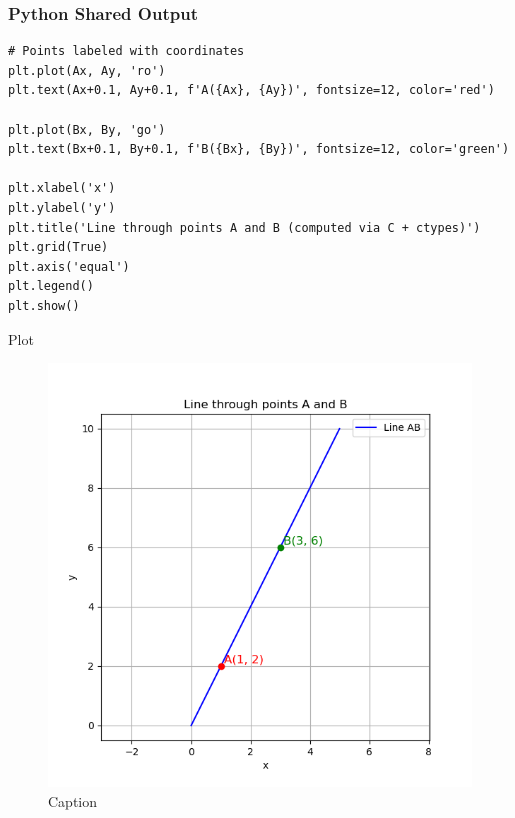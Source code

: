 \documentclass{beamer}
\begin{document}
\begin{frame}[fragile]
    \frametitle{Python Shared Output}
    \begin{lstlisting}
# Points labeled with coordinates
plt.plot(Ax, Ay, 'ro')
plt.text(Ax+0.1, Ay+0.1, f'A({Ax}, {Ay})', fontsize=12, color='red')

plt.plot(Bx, By, 'go')
plt.text(Bx+0.1, By+0.1, f'B({Bx}, {By})', fontsize=12, color='green')

plt.xlabel('x')
plt.ylabel('y')
plt.title('Line through points A and B (computed via C + ctypes)')
plt.grid(True)
plt.axis('equal')
plt.legend()
plt.show()
 \end{lstlisting}
\end{frame}  
\begin{frame}{Plot}
    \begin{figure}
        \centering
        \includegraphics[width=1.0\linewidth]{figs/fig1.png}
        \caption{Caption}
        \label{fig:placeholder}
    \end{figure}
\end{frame}
\end{document}

